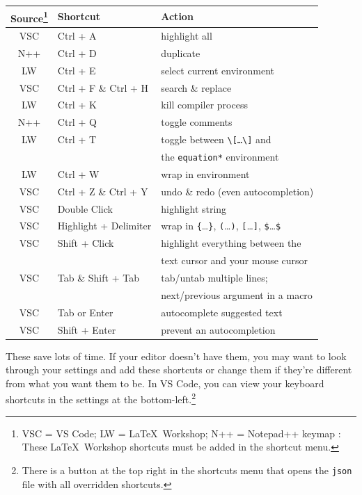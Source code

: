 \documentclass{article} 		%
\begin{document}
\begin{center}
	\begin{tabular}{|c||l||l|}
		\hline
		\textbf{Source}\footnote{
			VSC = VS Code; LW = \LaTeX\ Workshop; N++ = Notepad++ keymap \p
			\cby{\textbf{NOTE}}: These \LaTeX\ Workshop shortcuts must be added in the shortcut menu. 
		} & \textbf{Shortcut} & \textbf{Action} \\ \hline\hline
		VSC & Ctrl + A & highlight all \\ \hline
		N++ & Ctrl + D & duplicate \\ \hline
		LW & Ctrl + E & select current environment \\ \hline
		VSC & Ctrl + F \& Ctrl + H & search \& replace \\ \hline
		LW & Ctrl + K & kill compiler process \\ \hline
		N++ & Ctrl + Q & toggle comments \\ \hline
		LW & Ctrl + T & toggle between \texttt{\textbackslash[\dots\textbackslash]} and \\
		& & the \texttt{equation*} environment \\ \hline
		LW & Ctrl + W & wrap in environment \\ \hline
		VSC & Ctrl + Z \& Ctrl + Y & undo \& redo (even autocompletion) \\ \hline
		VSC & Double Click & highlight string \\ \hline
		VSC & Highlight + Delimiter & wrap in \texttt{\{}\dots\texttt{\}}, \texttt{(}\dots\texttt{)}, \texttt{[}\dots\texttt{]}, \texttt{\$}\dots\texttt{\$} \\ \hline
		VSC & Shift + Click & highlight everything between the \\ 
		& 			  & text cursor and your mouse cursor \\ \hline
		VSC & Tab \& Shift + Tab & tab/untab multiple lines; \\
		& 				   & next/previous argument in a macro \\ \hline
		VSC & Tab or Enter & autocomplete suggested text \\ \hline
		VSC & Shift + Enter & prevent an autocompletion \\ \hline
	\end{tabular}
\end{center}

These save lots of time. If your editor doesn't have them, you may want to look through your settings and add these shortcuts or change them if they're different from what you want them to be. In VS Code, you can view your keyboard shortcuts in the settings at the bottom-left.\footnote{
	There is a button at the top right in the shortcuts menu that opens the \texttt{json} file with all overridden shortcuts. 
}
\end{document}
